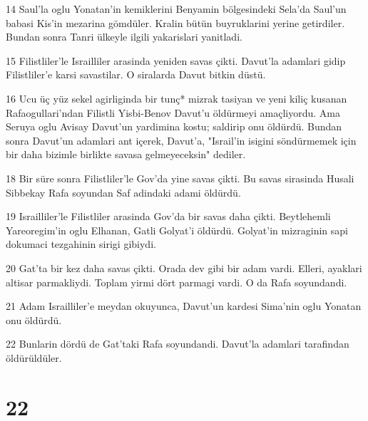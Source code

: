 \par 14 Saul'la oglu Yonatan'in kemiklerini Benyamin bölgesindeki Sela'da Saul'un babasi Kis'in mezarina gömdüler. Kralin bütün buyruklarini yerine getirdiler. Bundan sonra Tanri ülkeyle ilgili yakarislari yanitladi.
\par 15 Filistliler'le Israilliler arasinda yeniden savas çikti. Davut'la adamlari gidip Filistliler'e karsi savastilar. O siralarda Davut bitkin düstü.
\par 16 Ucu üç yüz sekel agirliginda bir tunç* mizrak tasiyan ve yeni kiliç kusanan Rafaogullari'ndan Filistli Yisbi-Benov Davut'u öldürmeyi amaçliyordu. Ama Seruya oglu Avisay Davut'un yardimina kostu; saldirip onu öldürdü. Bundan sonra Davut'un adamlari ant içerek, Davut'a, "Israil'in isigini söndürmemek için bir daha bizimle birlikte savasa gelmeyeceksin" dediler.
\par 18 Bir süre sonra Filistliler'le Gov'da yine savas çikti. Bu savas sirasinda Husali Sibbekay Rafa soyundan Saf adindaki adami öldürdü.
\par 19 Israilliler'le Filistliler arasinda Gov'da bir savas daha çikti. Beytlehemli Yareoregim'in oglu Elhanan, Gatli Golyat'i öldürdü. Golyat'in mizraginin sapi dokumaci tezgahinin sirigi gibiydi.
\par 20 Gat'ta bir kez daha savas çikti. Orada dev gibi bir adam vardi. Elleri, ayaklari altisar parmakliydi. Toplam yirmi dört parmagi vardi. O da Rafa soyundandi.
\par 21 Adam Israilliler'e meydan okuyunca, Davut'un kardesi Sima'nin oglu Yonatan onu öldürdü.
\par 22 Bunlarin dördü de Gat'taki Rafa soyundandi. Davut'la adamlari tarafindan öldürüldüler.

\chapter{22}

